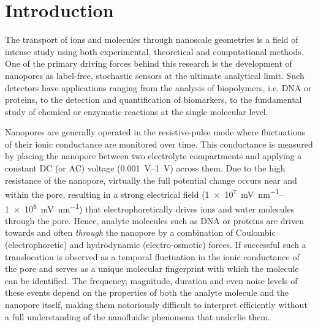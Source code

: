 \documentclass[journal=ancac3,manuscript=article,etalmode=truncate,maxauthors=0,layout=twocolumn]{achemso}
\begin{document}
\section{Introduction}

The transport of ions and molecules through nanoscale geometries is a field of intense study using both
experimental, theoretical and computational methods.\cite{Sparreboom-2010,Bocquet-2010,Maffeo-2012,
Thomas-2014,Wang-2014,Kim-2015} One of the primary driving forces behind this research is the development of
nanopores as label-free, stochastic sensors at the ultimate analytical limit.\cite{Bayley-2001,
Dekker-2007,Venkatesan-2011,Zhang-2016} Such detectors have applications ranging from the analysis of
biopolymers, i.e. DNA\cite{Deamer-2016,Kasianowicz-1996,Meller-2000,Maglia-2008,Butler-2008,Stoddart-2009,
Franceschini-2013,Jain-2018} or proteins,\cite{Restrepo-Perez-2018,Talaga-2009,Rodriguez-Larrea-2013,
Nivala-2013,Kennedy-2016} to the detection and quantification of biomarkers,\cite{Chen-2013,Soskine-2012,
Niedzwiecki-2013,VanMeervelt-2014,Huang-2017,Liu-2018,Galenkamp-2018} to the fundamental study of chemical or
enzymatic reactions at the single molecular level.\cite{Willems-VanMeervelt-2017,Lieberman-2010,
Nivala-2013,Ho-2015,Laszlo-2017}

Nanopores are generally operated in the resistive-pulse mode where fluctuations of their ionic conductance are
monitored over time.\cite{Bayley-2001,Dekker-2007,Maglia-2010,Venkatesan-2011} This conductance is measured by
placing the nanopore between two electrolyte compartments and applying a constant DC (or AC) voltage
(\SIrange{0.001}{1}{\volt}) across them. Due to the high resistance of the nanopore, virtually the full potential change occurs near and within the pore, resulting in a strong electrical field (\SIrange{1e7}{1e8}{\mV\per\nm}) that electrophoretically drives ions and water molecules through the
pore.\cite{Wong-2007,Mao-2014,Haywood-2014,Laohakunakorn-2015} Hence, analyte molecules such as DNA or
proteins are driven towards and often \emph{through} the nanopore by a combination of Coulombic
(electrophoretic) and hydrodynamic (electro-osmotic) forces.\cite{Wong-2007,Grosberg-2010,Muthukumar-2010,
Muthukumar-2014} If successful such a translocation is observed as a temporal fluctuation in the ionic
conductance of the pore and serves as a unique molecular fingerprint with which the molecule can be
identified.\cite{Yusko-2017} The frequency, magnitude, duration and even noise levels of these events depend
on the properties of both the analyte molecule and the nanopore itself, making them notoriously difficult to
interpret efficiently without a full understanding of the nanofluidic phenomena that underlie them.
\end{document}
